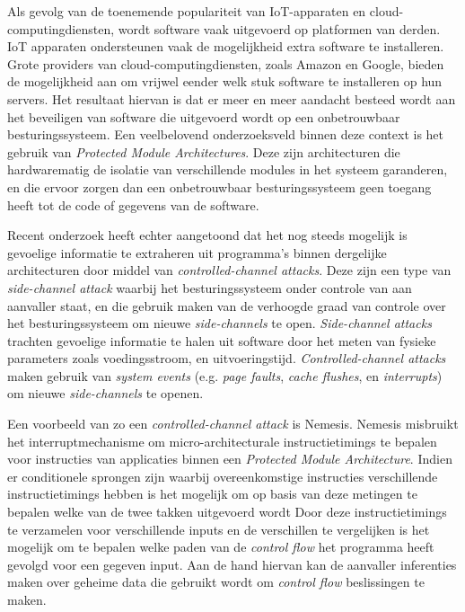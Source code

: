 \documentclass[master=cws,masteroption=ai, english]{kulemt}
\begin{document}
\begin{abstract*}
Als gevolg van de toenemende populariteit van IoT-apparaten en cloud-computingdiensten, wordt software vaak uitgevoerd op platformen van derden. 
IoT apparaten ondersteunen vaak de mogelijkheid extra software te installeren. Grote providers van cloud-computingdiensten, zoals Amazon en Google, bieden de mogelijkheid aan 
om vrijwel eender welk stuk software te installeren op hun servers. 
Het resultaat hiervan is dat er meer en meer aandacht besteed wordt aan het beveiligen van software die uitgevoerd wordt op een onbetrouwbaar besturingssysteem. 
Een veelbelovend onderzoeksveld binnen deze context is het gebruik van \textit{Protected Module Architectures}. 
Deze zijn architecturen die hardwarematig de isolatie van verschillende modules in het systeem garanderen, en die ervoor zorgen dan een onbetrouwbaar besturingssysteem geen toegang
heeft tot de code of gegevens van de software. 

Recent onderzoek heeft echter aangetoond dat het nog steeds mogelijk is gevoelige informatie te extraheren uit programma's binnen dergelijke architecturen door middel van \textit{controlled-channel attacks}. 
Deze zijn een type van \textit{side-channel attack} waarbij het besturingssysteem onder controle van aan aanvaller staat, en die gebruik maken van de verhoogde graad van controle over het besturingssysteem om nieuwe \textit{side-channels} te open. 
\textit{Side-channel attacks} trachten gevoelige informatie te halen uit software door het meten van fysieke parameters zoals voedingsstroom, en uitvoeringstijd. 
\textit{Controlled-channel attacks} maken gebruik van \textit{system events} (e.g. \textit{page faults}, \textit{cache flushes}, en \textit{interrupts}) om nieuwe 
\textit{side-channels} te openen. 

Een voorbeeld van zo een \textit{controlled-channel attack} is Nemesis. Nemesis misbruikt het interruptmechanisme om micro-architecturale instructietimings te bepalen voor
instructies van applicaties binnen een \textit{Protected Module Architecture}. 
Indien er conditionele sprongen zijn waarbij overeenkomstige instructies verschillende instructietimings hebben is het mogelijk om op basis van deze metingen te bepalen welke van de twee takken uitgevoerd wordt
Door deze instructietimings te verzamelen voor verschillende inputs en de verschillen te vergelijken
is het mogelijk om te bepalen welke paden van de \textit{control flow} het programma heeft gevolgd voor een gegeven input. 
Aan de hand hiervan kan de aanvaller inferenties maken over geheime data die gebruikt wordt om \textit{control flow} beslissingen te maken. 


\end{abstract*}
\end{document}
